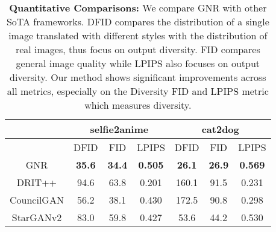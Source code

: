 \begin{table*}[]
\centering
\begin{tabular}{c|c|c|c|c|c|c}
    &\multicolumn{3}{c}{selfie2anime} &\multicolumn{3}{c}{cat2dog} \\
     \hline
    & DFID  &FID  & LPIPS   & DFID  &FID  & LPIPS  \\ \hline
    GNR        & \textbf{35.6} & \textbf{34.4} &\textbf{0.505} & \textbf{26.1}  &\textbf{26.9} & \textbf{0.569} \\ \hline
    DRIT++     & 94.6 & 63.8 & 0.201 & 160.1 &91.5 & 0.231 \\ \hline
    CouncilGAN & 56.2 & 38.1 & 0.430 & 172.5 & 90.8 & 0.298\\ \hline
    StarGANv2  & 83.0 & 59.8 & 0.427 & 53.6 & 44.2 & 0.530\\ 
\end{tabular}
\caption{\textbf{Quantitative Comparisons:} We compare GNR with other SoTA frameworks. DFID compares the distribution of a single image translated with different styles with the distribution of real images, thus focus on output diversity. FID compares general image quality while LPIPS also focuses on output diversity. Our method shows significant improvements across all metrics, especially on the Diversity FID and LPIPS metric which measures diversity.}
\label{tab:fid}
\end{table*}
